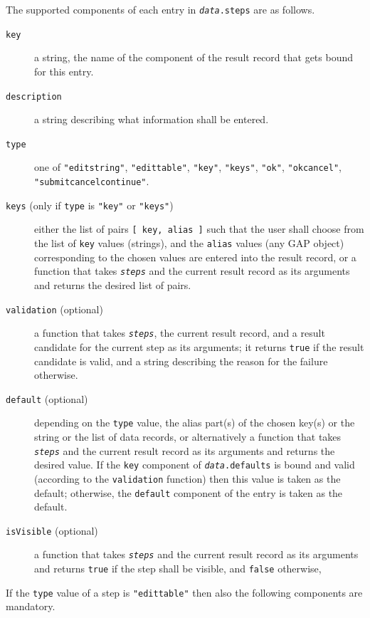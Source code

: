 \documentclass[a4paper,11pt]{report}
\begin{document}
{{{ The supported components of each entry in \mbox{\texttt{\mdseries\slshape data}}\texttt{.steps} are as follows. 
\begin{description}
\item[{\texttt{key}}]  a string, the name of the component of the result record that gets bound for
this entry. 
\item[{\texttt{description}}]  a string describing what information shall be entered. 
\item[{\texttt{type}}]  one of \texttt{"editstring"}, \texttt{"edittable"}, \texttt{"key"}, \texttt{"keys"}, \texttt{"ok"}, \texttt{"okcancel"}, \texttt{"submitcancelcontinue"}. 
\item[{\texttt{keys} (only if \texttt{type} is \texttt{"key"} or \texttt{"keys"})}]  either the list of pairs \texttt{[ key, alias ]} such that the user shall choose from the list of \texttt{key} values (strings), and the \texttt{alias} values (any \textsf{GAP} object) corresponding to the chosen values are entered into the result record,
or a function that takes \mbox{\texttt{\mdseries\slshape steps}} and the current result record as its arguments and returns the desired list of
pairs. 
\item[{\texttt{validation} (optional)}]  a function that takes \mbox{\texttt{\mdseries\slshape steps}}, the current result record, and a result candidate for the current step as
its arguments; it returns \texttt{true} if the result candidate is valid, and a string describing the reason for the
failure otherwise. 
\item[{\texttt{default} (optional)}]  depending on the \texttt{type} value, the alias part(s) of the chosen key(s) or the string or the list of
data records, or alternatively a function that takes \mbox{\texttt{\mdseries\slshape steps}} and the current result record as its arguments and returns the desired value.
If the \texttt{key} component of \mbox{\texttt{\mdseries\slshape data}}\texttt{.defaults} is bound and valid (according to the \texttt{validation} function) then this value is taken as the default; otherwise, the \texttt{default} component of the entry is taken as the default. 
\item[{\texttt{isVisible} (optional)}]  a function that takes \mbox{\texttt{\mdseries\slshape steps}} and the current result record as its arguments and returns \texttt{true} if the step shall be visible, and \texttt{false} otherwise, 
\end{description}
 

 If the \texttt{type} value of a step is \texttt{"edittable"} then also the following components are mandatory. 

}}}
\end{document}
